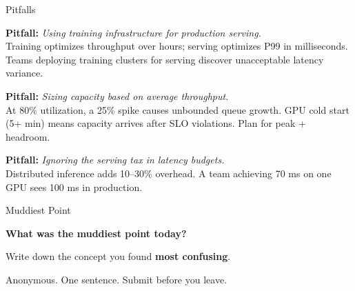 \documentclass[aspectratio=169, 12pt]{beamer}
\begin{document}
\begin{frame}{Pitfalls}

\footnotesize
\textbf{Pitfall:} \textit{Using training infrastructure for production serving.}\\
{\scriptsize Training optimizes throughput over hours; serving optimizes P99 in milliseconds. Teams deploying training clusters for serving discover unacceptable latency variance.}

\vspace{0.08cm}
\textbf{Pitfall:} \textit{Sizing capacity based on average throughput.}\\
{\scriptsize At 80\% utilization, a 25\% spike causes unbounded queue growth. GPU cold start (5+ min) means capacity arrives after SLO violations. Plan for peak + headroom.}

\vspace{0.08cm}
\textbf{Pitfall:} \textit{Ignoring the serving tax in latency budgets.}\\
{\scriptsize Distributed inference adds 10--30\% overhead. A team achieving 70 ms on one GPU sees 100 ms in production.}

\end{frame}


\begin{frame}{Muddiest Point}

\centering
\vspace{1.0cm}
{\Large\bfseries What was the \alert{muddiest point} today?}

\vspace{0.8cm}
{\normalsize Write down the concept you found \textbf{most confusing}.}

\vspace{0.5cm}
{\small\textcolor{midgray}{Anonymous. One sentence. Submit before you leave.}}

\end{frame}
\end{document}
